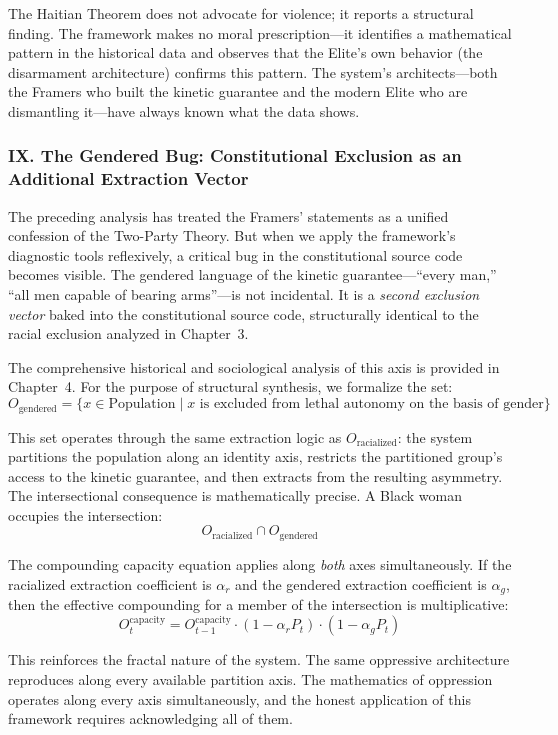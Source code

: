 \documentclass[12pt,openany]{book}
\begin{document}
The Haitian Theorem does not advocate for violence; it reports a structural finding. The framework makes no moral prescription---it identifies a mathematical pattern in the historical data and observes that the Elite's own behavior (the disarmament architecture) confirms this pattern. The system's architects---both the Framers who built the kinetic guarantee and the modern Elite who are dismantling it---have always known what the data shows.

\subsubsection*{IX. The Gendered Bug: Constitutional Exclusion as an Additional Extraction Vector}

The preceding analysis has treated the Framers' statements as a unified confession of the Two-Party Theory. But when we apply the framework's diagnostic tools reflexively, a critical bug in the constitutional source code becomes visible. The gendered language of the kinetic guarantee---``every man,'' ``all men capable of bearing arms''---is not incidental. It is a \textit{second exclusion vector} baked into the constitutional source code, structurally identical to the racial exclusion analyzed in Chapter~3.

The comprehensive historical and sociological analysis of this axis is provided in Chapter~4. For the purpose of structural synthesis, we formalize the set:
\[
O_{\text{gendered}} = \{x \in \text{Population} \mid x \text{ is excluded from lethal autonomy on the basis of gender}\}
\]

This set operates through the same extraction logic as $O_{\text{racialized}}$: the system partitions the population along an identity axis, restricts the partitioned group's access to the kinetic guarantee, and then extracts from the resulting asymmetry. The intersectional consequence is mathematically precise. A Black woman occupies the intersection:
\[
O_{\text{racialized}} \cap O_{\text{gendered}}
\]

The compounding capacity equation applies along \textit{both} axes simultaneously. If the racialized extraction coefficient is $\alpha_r$ and the gendered extraction coefficient is $\alpha_g$, then the effective compounding for a member of the intersection is multiplicative:
\[
O_t^{\text{capacity}} = O_{t-1}^{\text{capacity}} \cdot (1 - \alpha_r P_t) \cdot (1 - \alpha_g P_t)
\]

This reinforces the fractal nature of the system. The same oppressive architecture reproduces along every available partition axis. The mathematics of oppression operates along every axis simultaneously, and the honest application of this framework requires acknowledging all of them.
\end{document}
